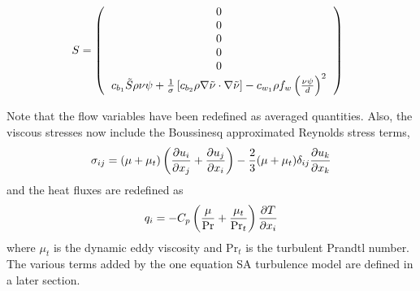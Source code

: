 \begin{equation}
S = \l(
\begin{tabular}{c}
$0$\\
$0$\\
$0$\\
$0$\\
$0$ \\
$c_{b_1}\tilde S \rho\nu\psi + \frac{1}{\sigma}\left[c_{b_2}\rho\nabla\tilde\nu\cdot\nabla\tilde\nu\right] - c_{w_1}\rho f_w \left(\frac{\nu\psi}{d}\right)^2$
\end{tabular}
\r) \;\; 
\end{equation}

Note that the flow variables have been redefined as averaged quantities. Also, the viscous stresses now include the Boussinesq approximated Reynolds stress terms,
\begin{equation}
\sigma_{ij} = (\mu+\mu_t)\left( \frac{\partial u_i}{\partial x_j}
+ \frac{\partial u_j}{\partial x_i} \right)
- \frac{2}{3}(\mu+\mu_t) \delta_{ij}\frac{\partial u_k}{\partial x_k}
\end{equation}
and the heat fluxes are redefined as
\begin{equation}
q_i = -C_p\left( \frac{\mu}{\text{Pr}} + \frac{\mu_t}{\text{Pr}_t}\right)\frac{\partial T}{\partial x_i}
\end{equation}
where $\mu_t$ is the dynamic eddy viscosity and $\text{Pr}_t$ is the turbulent Prandtl number. The various terms added by the one equation SA turbulence model are defined in a later section.
